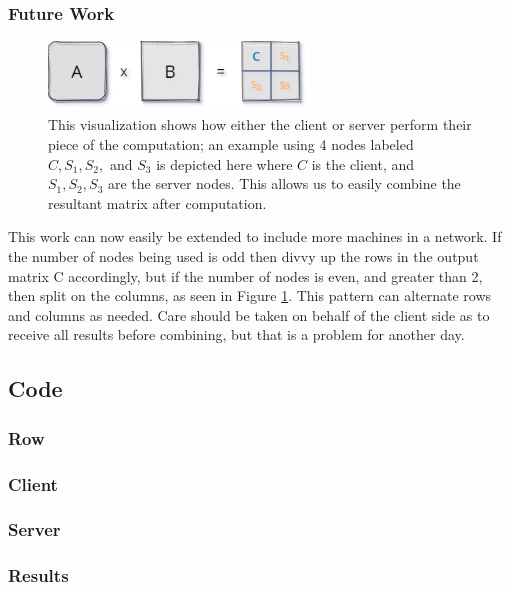 \documentclass[12pt]{article}
\begin{document}
		\subsubsection*{Future Work}
			\begin{figure}
				\centering\includegraphics[width=0.618\textwidth]{../imgs/clientserver3}
				\caption{This visualization shows how either the client or server perform their piece of the computation; an example using 4 nodes labeled $C, S_1, S_2,$ and $S_3$ is depicted here where $C$ is the client, and $S_1,S_2,S_3$ are the server nodes. This allows us to easily combine the resultant matrix after computation.}
				\label{fig:cs3}
			\end{figure}
			This work can now easily be extended to include more machines in a network. If the number of nodes being used is odd then divvy up the rows in the output matrix C accordingly, but if the number of nodes is even, and greater than 2, then split on the columns, as seen in Figure \ref{fig:cs3}. This pattern can alternate rows and columns as needed. Care should be taken on behalf of the client side as to receive all results before combining, but that is a problem for another day.
			
	\newpage
	\subsection*{Code}
		\subsubsection*{Row}
			
		\subsubsection*{Client}
			
		\subsubsection*{Server}
			
		\subsubsection*{Results}
			
			
			
\end{document}
